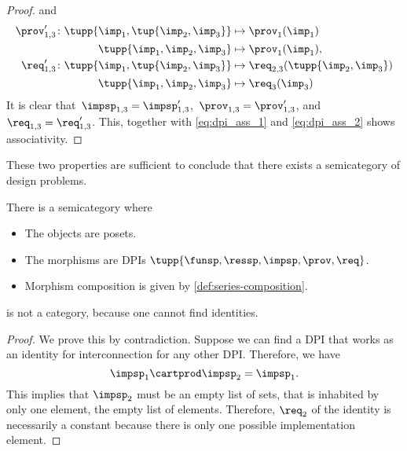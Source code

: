 \begin{proof}
    and
    \begin{equation}
        \begin{aligned}
            \prov'_{1,3} \colon  \tupp{\imp_{1}, \tup{\imp_{2}, \imp_{3}}} & \mapsto\prov_{1}(\imp_{1}) \\
            \tupp{\imp_{1}, \imp_{2}, \imp_{3}}                            & \mapsto\prov_{1}(\imp_{1}), \\
            \req'_{1,3} \colon  \tupp{\imp_{1}, \tup{\imp_{2}, \imp_{3}}}  & \mapsto\req_{2,3}(\tupp{\imp_{2}, \imp_{3}}) \\
            \tupp{\imp_{1}, \imp_{2}, \imp_{3}}                            & \mapsto \req_{3}(\imp_{3})
        \end{aligned}
    \end{equation}
    It is clear that~$\impsp_{1,3}=\impsp'_{1,3}$,~$\prov_{1,3}=\prov'_{1,3}$, and~$\req_{1,3}=\req'_{1,3}$.
    This, together with \cref{eq:dpi_ass_1} and \cref{eq:dpi_ass_2} shows associativity.
\end{proof}

These two properties are sufficient to conclude that there exists a semicategory of design problems.

\begin{definition}
    \label{def:DPIcat}
    There is a semicategory \DPI where
    \begin{itemize}
        \item The objects are posets.
        \item The morphisms are DPIs $\tupp{\funsp,\ressp,\impsp,\prov,\req}$.
        \item Morphism composition is given by \cref{def:series-composition}.
    \end{itemize}
\end{definition}

\begin{lemma}
    \DPI is not a category, because one cannot find identities.
\end{lemma}
\begin{proof}
    We prove this by contradiction.
    Suppose we can find a DPI that works as an identity for interconnection for any other DPI.
    Therefore, we have
    \begin{equation}
        \impsp_{1} \cartprod \impsp_{2} = \impsp_{1}.
    \end{equation}
    This implies that $\impsp_{2}$ must be an empty list of sets, that is inhabited by only one element, the empty list of elements.
    Therefore, $\req_2$ of the identity is necessarily a constant because there is only one possible implementation element.
\end{proof}

